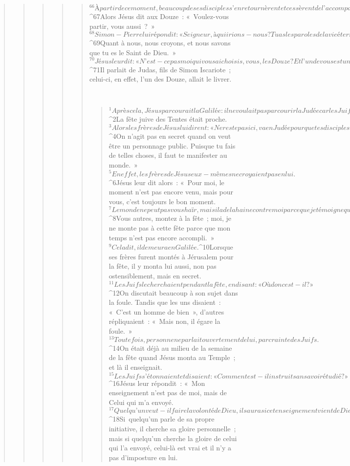 \begin{verse}
\begin{verse}
\begin{verse}
\begin{verse}
\begin{verse}
${}^{66}À partir de ce moment, beaucoup de ses disciples s’en retournèrent et cessèrent de l’accompagner. 
${}^{67}Alors Jésus dit aux Douze : « Voulez-vous partir, vous aussi ? » 
${}^{68}Simon-Pierre lui répondit : « Seigneur, à qui irions-nous ? Tu as les paroles de la vie éternelle. 
${}^{69}Quant à nous, nous croyons, et nous savons que tu es le Saint de Dieu. » 
${}^{70}Jésus leur dit : « N’est-ce pas moi qui vous ai choisis, vous, les Douze ? Et l’un de vous est un diable ! » 
${}^{71}Il parlait de Judas, fils de Simon Iscariote ; celui-ci, en effet, l’un des Douze, allait le livrer.
      
         
      \bchapter{}
      \begin{verse}
${}^{1}Après cela, Jésus parcourait la Galilée : il ne voulait pas parcourir la Judée car les Juifs cherchaient à le tuer. 
${}^{2}La fête juive des Tentes était proche.
${}^{3}Alors les frères de Jésus lui dirent : « Ne reste pas ici, va en Judée pour que tes disciples aussi voient les œuvres que tu fais. 
${}^{4}On n’agit pas en secret quand on veut être un personnage public. Puisque tu fais de telles choses, il faut te manifester au monde. » 
${}^{5}En effet, les frères de Jésus eux-mêmes ne croyaient pas en lui. 
${}^{6}Jésus leur dit alors : « Pour moi, le moment n’est pas encore venu, mais pour vous, c’est toujours le bon moment. 
${}^{7}Le monde ne peut pas vous haïr, mais il a de la haine contre moi parce que je témoigne que ses œuvres sont mauvaises. 
${}^{8}Vous autres, montez à la fête ; moi, je ne monte pas à cette fête parce que mon temps n’est pas encore accompli. » 
${}^{9}Cela dit, il demeura en Galilée. 
${}^{10}Lorsque ses frères furent montés à Jérusalem pour la fête, il y monta lui aussi, non pas ostensiblement, mais en secret.
${}^{11}Les Juifs le cherchaient pendant la fête, en disant : « Où donc est-il ? » 
${}^{12}On discutait beaucoup à son sujet dans la foule. Tandis que les uns disaient : « C’est un homme de bien », d’autres répliquaient : « Mais non, il égare la foule. » 
${}^{13}Toutefois, personne ne parlait ouvertement de lui, par crainte des Juifs.
${}^{14}On était déjà au milieu de la semaine de la fête quand Jésus monta au Temple ; et là il enseignait. 
${}^{15}Les Juifs s’étonnaient et disaient : « Comment est-il instruit sans avoir étudié ? » 
${}^{16}Jésus leur répondit : « Mon enseignement n’est pas de moi, mais de Celui qui m’a envoyé. 
${}^{17}Quelqu’un veut-il faire la volonté de Dieu, il saura si cet enseignement vient de Dieu, ou si je parle de ma propre initiative. 
${}^{18}Si quelqu’un parle de sa propre initiative, il cherche sa gloire personnelle ; mais si quelqu’un cherche la gloire de celui qui l’a envoyé, celui-là est vrai et il n’y a pas d’imposture en lui. 

\end{verse}
\end{verse}
\end{verse}
\end{verse}
\end{verse}
\end{verse}
